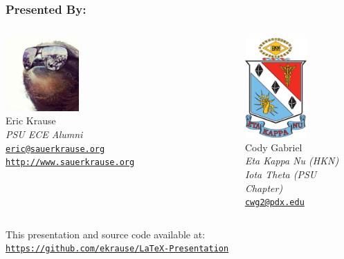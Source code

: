 \documentclass[notes=only]{beamer}
\begin{document}
\begin{frame} \frametitle{Presented By:}
    \begin{columns}[T]
            \begin{center}
                \small
                \vspace{.2in}\hspace{-.4in}
                \includegraphics[height=1.1in]{Resources/ekrause.jpg}\\
                Eric Krause\\
                \textit{PSU ECE Alumni}\\
                \texttt{\href{mailto:eric+latex@sauerkrause.org}{eric@sauerkrause.org}}
                \texttt{\href{http://www.sauerkrause.org}{http://www.sauerkrause.org}}
            \end{center}
            \begin{center}
                \small
                \vspace{-.2in}
                \includegraphics[height=1.5in]{Resources/hkn.png}\\
                Cody Gabriel\\
                \textit{Eta Kappa Nu (HKN)}\\
                \textit{Iota Theta (PSU Chapter)}\\
                \texttt{\href{mailto:cwg2@pdx.edu}{cwg2@pdx.edu}}
            \end{center}    
        \end{columns}
        \begin{center}This presentation and source code available at:\\
            \texttt{\href{https://github.com/ekrause/LaTeX-Presentation}{https://github.com/ekrause/LaTeX-Presentation}}\\
        \end{center}
\end{frame}
\end{document}

